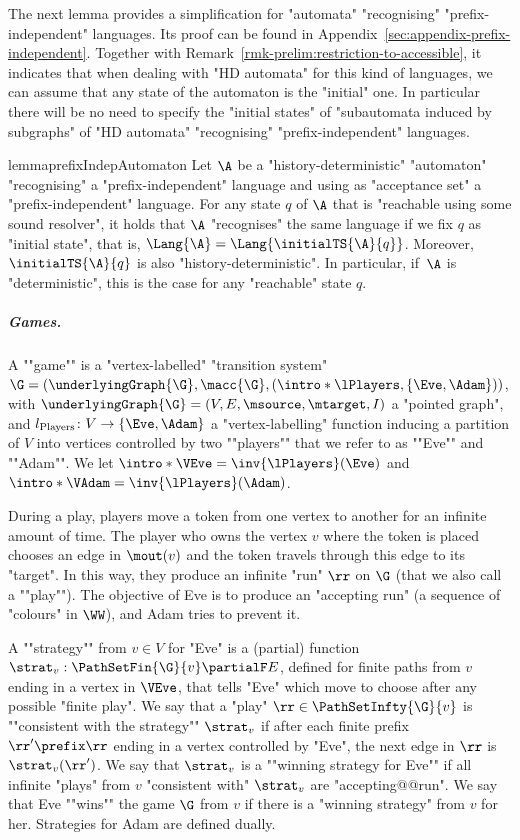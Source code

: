 \documentclass{theoretics}
\begin{document}
The next lemma provides a simplification for "automata" "recognising" "prefix-independent" languages. Its proof can be found in Appendix~\ref{sec:appendix-prefix-independent}. Together with Remark~\ref{rmk-prelim:restriction-to-accessible}, it indicates that when dealing with "HD automata" for this kind of languages, we can assume that any state of the automaton is the "initial" one.
In particular there will be no need to specify the "initial states" of "subautomata induced by subgraphs" of "HD automata" "recognising" "prefix-independent" languages.

\begin{restatable}{lemma}{prefixIndepAutomaton}\label{lemma-prelims:prefix-indep-automaton}
	Let $\A$ be a "history-deterministic" "automaton" "recognising" a "prefix-independent" language and using as "acceptance set" a "prefix-independent" language. For any state $q$ of $\A$ that is "reachable using some sound resolver", it holds that $\A$ "recognises" the same language if we fix $q$ as "initial state", that is, $\Lang{\A} = \Lang{\initialTS{\A}{q}}$. Moreover, $\initialTS{\A}{q}$ is also "history-deterministic".  In particular, if~$\A$ is "deterministic", this is the case for any "reachable" state $q$.
\end{restatable}




\subparagraph*{Games.} \AP A ""game"" is a "vertex-labelled" "transition system" $\G = \left(\underlyingGraph{\G}, \macc{\G}, (\intro*\lPlayers, \{\Eve, \Adam\})\right)$, with $\underlyingGraph{\G} = (V,E,\msource, \mtarget, I)$ a "pointed graph", %
and $l_{\mathrm{Players}}\colon V \to \{\Eve, \Adam\}$ a "vertex-labelling" function inducing a partition of $V$ into vertices controlled by two ""players"" that we refer to as ""Eve"" and ""Adam"". We let $\intro*\VEve = \inv{\lPlayers}(\Eve)$ and $\intro*\VAdam = \inv{\lPlayers}(\Adam)$.

During a play, players move a token from one vertex to another for an infinite amount of time. %
\AP The player who owns the vertex $v$ where the token is placed chooses an edge in $\mout(v)$ and the token travels through this edge to its "target". In this way, they produce an infinite "run" $\rr$ on $\G$ (that we also call a ""play""). 
The objective of Eve is to produce an "accepting run" (a sequence of "colours" in $\WW$), and Adam tries to prevent it.


\AP A ""strategy"" from $v\in V$ for "Eve" is a (partial) function $\strat_{v}: \PathSetFin{\G}{v}  \partialF E$, defined for finite paths from $v$ ending in a vertex in $\VEve$, that tells "Eve" which move to choose after any possible "finite play".
\AP We say that a "play" $\rr\in \PathSetInfty{\G}{v}$ is ""consistent with the strategy"" $\strat_v$ if after each finite prefix $\rr' \prefix \rr$ ending in a vertex controlled by "Eve", the next edge in $\rr$ is $\strat_v(\rr')$.
\AP  We say that $\strat_v$ is a ""winning strategy for Eve"" if all infinite "plays" from $v$ "consistent with" $\strat_v$ are "accepting@@run". We say that Eve ""wins"" the game $\G$ from $v$ if there is a "winning strategy" from $v$ for her. Strategies for Adam are defined dually.
\end{document}
